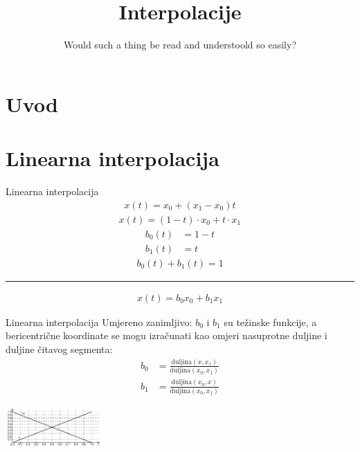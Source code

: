 \documentclass[9pt]{beamer}
\title{Interpolacije}
\subtitle{ Would such a thing be read and understoold so easily?}
\institute{Računalna grafika}
\begin{document}
\begin{frame}
 \titlepage
\end{frame}

\section{Uvod}
\section{Linearna interpolacija}
\begin{frame}{Linearna interpolacija}
	\begin{align*}
	x(t) = x_0 + (x_1-x_0)t
	\end{align*}
	\begin{align*}
	x(t) = (1-t)\cdot x_0 + t\cdot x_1
	\end{align*}
	\begin{align*}
	b_0(t) & = 1-t \\
	b_1(t) & = t
 	\end{align*}
 	\begin{align*}
 	b_0(t) + b_1(t) = 1
 	\end{align*}
 	\hrule\hfill
 	\begin{align*}
 	x(t) = b_0 x_0 + b_1 x_1
 	\end{align*}
\end{frame}
\begin{frame}{Linearna interpolacija}
	Umjereno zanimljivo: $b_0$ i $b_1$ su težinske funkcije, a bericentrične koordinate se mogu izračunati kao omjeri nasuprotne duljine i duljine čitavog segmenta:
	\begin{align*}
	b_0 & = \frac{\textrm{duljina}(x, x_1)}{\textrm{duljina}(x_0, x_1)} \\
	b_1 & = \frac{\textrm{duljina}(x_0, x)}{\textrm{duljina}(x_0, x_1)}
	\end{align*}
	\begin{center}
		\includegraphics[height=1.5cm]{./slike/lin_interp_01.png}
	\end{center}
\end{frame}
\end{document}
